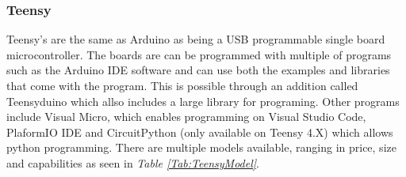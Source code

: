 \subsubsection{Teensy}

Teensy's are the same as Arduino as being a USB programmable single board microcontroller.
The boards are can be programmed with multiple of programs such as the Arduino IDE software and can use both the examples and libraries that come with the program.
This is possible through an addition called Teensyduino which allso includes a large library for programing.
Other programs include Visual Micro, which enables programming on Visual Studio Code, PlaformIO IDE and CircuitPython (only available on Teensy 4.X) which allows python programming.
There are multiple models available, ranging in price, size and capabilities as seen in \textit{Table \ref{Tab:TeensyModel}}.


